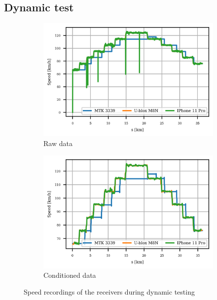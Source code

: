 \documentclass{article}
\begin{document}
		\subsection{Dynamic test}
			\begin{figure}[h]
		   		\centering
		     	\begin{subfigure}[b]{0.45\textwidth}
		      		\centering
		      	  	\includegraphics[width=\textwidth]{Dynamic/raw_speed.png}
		      	  	\caption{Raw data}
		     	\end{subfigure}
		     	\begin{subfigure}[b]{0.45\textwidth}
		      	   \centering
		      	   \includegraphics[width=\textwidth]{Dynamic/cond_speed.png}
		      	   \caption{Conditioned data}
		     	\end{subfigure}
		     	
		      \caption{Speed recordings of the receivers during dynamic testing}
		      \label{fig:static_loc_iPhone}
			\end{figure}		
\end{document}
